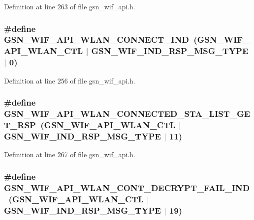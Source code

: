 Definition at line 263 of file gsn\_\-wif\_\-api.h.

\hypertarget{a00606_a4235ab97a11c5af4b6fd612919a35aa5}{
\subsubsection[{GSN\_\-WIF\_\-API\_\-WLAN\_\-CONNECT\_\-IND}]{\setlength{\rightskip}{0pt plus 5cm}\#define GSN\_\-WIF\_\-API\_\-WLAN\_\-CONNECT\_\-IND~(GSN\_\-WIF\_\-API\_\-WLAN\_\-CTL $|$ GSN\_\-WIF\_\-IND\_\-RSP\_\-MSG\_\-TYPE $|$ 0)}}
\label{a00606_a4235ab97a11c5af4b6fd612919a35aa5}


Definition at line 256 of file gsn\_\-wif\_\-api.h.

\hypertarget{a00606_af666ac0238396dacb1d840f30722e0e0}{
\subsubsection[{GSN\_\-WIF\_\-API\_\-WLAN\_\-CONNECTED\_\-STA\_\-LIST\_\-GET\_\-RSP}]{\setlength{\rightskip}{0pt plus 5cm}\#define GSN\_\-WIF\_\-API\_\-WLAN\_\-CONNECTED\_\-STA\_\-LIST\_\-GET\_\-RSP~(GSN\_\-WIF\_\-API\_\-WLAN\_\-CTL $|$ GSN\_\-WIF\_\-IND\_\-RSP\_\-MSG\_\-TYPE $|$ 11)}}
\label{a00606_af666ac0238396dacb1d840f30722e0e0}


Definition at line 267 of file gsn\_\-wif\_\-api.h.

\hypertarget{a00606_a050382039d7970aecd125e5650867a63}{
\subsubsection[{GSN\_\-WIF\_\-API\_\-WLAN\_\-CONT\_\-DECRYPT\_\-FAIL\_\-IND}]{\setlength{\rightskip}{0pt plus 5cm}\#define GSN\_\-WIF\_\-API\_\-WLAN\_\-CONT\_\-DECRYPT\_\-FAIL\_\-IND~(GSN\_\-WIF\_\-API\_\-WLAN\_\-CTL $|$ GSN\_\-WIF\_\-IND\_\-RSP\_\-MSG\_\-TYPE $|$ 19)}}
\label{a00606_a050382039d7970aecd125e5650867a63}


